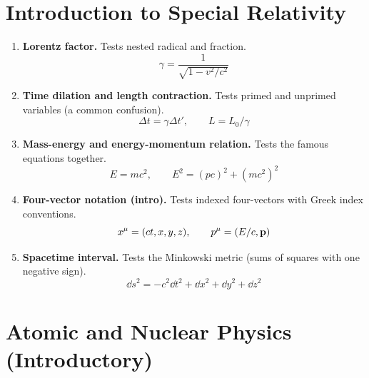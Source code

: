 \documentclass[11pt]{article}
\begin{document}
\section{Introduction to Special Relativity}

\begin{enumerate}

\item \textbf{Lorentz factor.}
Tests nested radical and fraction.
\[
  \gamma = \frac{1}{\sqrt{1 - v^2/c^2}}
\]

\item \textbf{Time dilation and length contraction.}
Tests primed and unprimed variables (a common confusion).
\[
  \Delta t = \gamma \Delta t', \qquad
  L = L_0/\gamma
\]

\item \textbf{Mass-energy and energy-momentum relation.}
Tests the famous equations together.
\[
  E = mc^2, \qquad
  E^2 = (pc)^2 + (mc^2)^2
\]

\item \textbf{Four-vector notation (intro).}
Tests indexed four-vectors with Greek index conventions.
\[
  x^\mu = (ct, x, y, z), \qquad
  p^\mu = (E/c, \vb{p})
\]

\item \textbf{Spacetime interval.}
Tests the Minkowski metric (sums of squares with one negative sign).
\[
  \dd{s}^2 = -c^2 \dd{t}^2 + \dd{x}^2 + \dd{y}^2 + \dd{z}^2
\]

\end{enumerate}

\section{Atomic and Nuclear Physics (Introductory)}
\end{document}
